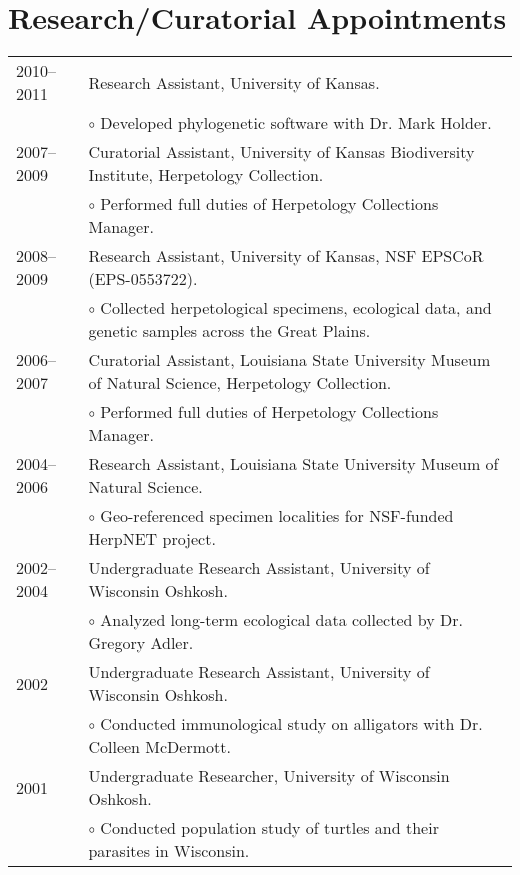 \documentclass[10pt]{article}
\renewcommand{\labelitemi}{$\circ$}
\newcommand{\tableSubItem}{\addtolength{\leftskip}{1em} \labelitemi \xspace}
\begin{document}
\section*{Research/Curatorial Appointments}
\noindent\begin{tabulary}{\textwidth}{ @{} l L @{} }
2010--2011	& Research Assistant, University of Kansas. \\
			& \tableSubItem Developed phylogenetic software with Dr. Mark Holder. \\[0.25em]
2007--2009	& Curatorial Assistant, University of Kansas Biodiversity Institute, Herpetology Collection. \\
			& \tableSubItem Performed full duties of Herpetology Collections Manager. \\[0.25em]
2008--2009	& Research Assistant, University of Kansas, NSF EPSCoR (EPS-0553722). \\
			& \tableSubItem Collected herpetological specimens, ecological data, and genetic samples across the Great Plains. \\[0.25em]
2006--2007	& Curatorial Assistant, Louisiana State University Museum of Natural Science, Herpetology Collection. \\
			& \tableSubItem Performed full duties of Herpetology Collections Manager. \\[0.25em]
2004--2006	& Research Assistant, Louisiana State University Museum of Natural Science. \\
			& \tableSubItem Geo-referenced specimen localities for NSF-funded HerpNET project. \\[0.25em]
2002--2004	& Undergraduate Research Assistant, University of Wisconsin Oshkosh. \\
			& \tableSubItem Analyzed long-term ecological data collected by Dr. Gregory Adler. \\[0.25em]
2002			& Undergraduate Research Assistant, University of Wisconsin Oshkosh. \\
			& \tableSubItem Conducted immunological study on alligators with Dr. Colleen McDermott. \\[0.25em]
2001			& Undergraduate Researcher, University of Wisconsin Oshkosh. \\
			& \tableSubItem Conducted population study of turtles and their parasites in Wisconsin. \\
\end{tabulary}
\end{document}
